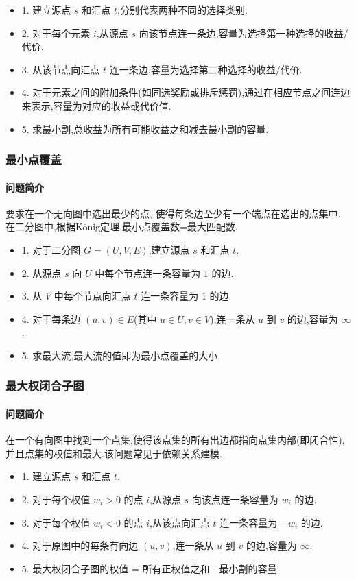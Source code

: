 \begin{itemize}
    \item 1. 建立源点 $s$ 和汇点 $t$,分别代表两种不同的选择类别.
    \item 2. 对于每个元素 $i$,从源点 $s$ 向该节点连一条边,容量为选择第一种选择的收益/代价.
    \item 3. 从该节点向汇点 $t$ 连一条边,容量为选择第二种选择的收益/代价.
    \item 4. 对于元素之间的附加条件(如同选奖励或排斥惩罚),通过在相应节点之间连边来表示,容量为对应的收益或代价值.
    \item 5. 求最小割,总收益为所有可能收益之和减去最小割的容量.
\end{itemize}

\subsubsection{最小点覆盖}
\paragraph{问题简介}
要求在一个无向图中选出最少的点,
使得每条边至少有一个端点在选出的点集中.
在二分图中,根据König定理,最小点覆盖数=最大匹配数.

\begin{itemize}
    \item 1. 对于二分图 $G=(U,V,E)$,建立源点 $s$ 和汇点 $t$.
    \item 2. 从源点 $s$ 向 $U$ 中每个节点连一条容量为 $1$ 的边.
    \item 3. 从 $V$ 中每个节点向汇点 $t$ 连一条容量为 $1$ 的边.
    \item 4. 对于每条边 $(u,v) \in E$(其中 $u \in U, v \in V$),连一条从 $u$ 到 $v$ 的边,容量为 $\infty$.
    \item 5. 求最大流,最大流的值即为最小点覆盖的大小.
\end{itemize}

\subsubsection{最大权闭合子图}
\paragraph{问题简介}
在一个有向图中找到一个点集,使得该点集的所有出边都指向点集内部(即闭合性),
并且点集的权值和最大.该问题常见于依赖关系建模.

\begin{itemize}
    \item 1. 建立源点 $s$ 和汇点 $t$.
    \item 2. 对于每个权值 $w_i > 0$ 的点 $i$,从源点 $s$ 向该点连一条容量为 $w_i$ 的边.
    \item 3. 对于每个权值 $w_i < 0$ 的点 $i$,从该点向汇点 $t$ 连一条容量为 $-w_i$ 的边.
    \item 4. 对于原图中的每条有向边 $(u,v)$,连一条从 $u$ 到 $v$ 的边,容量为 $\infty$.
    \item 5. 最大权闭合子图的权值 = 所有正权值之和 - 最小割的容量.
\end{itemize}

